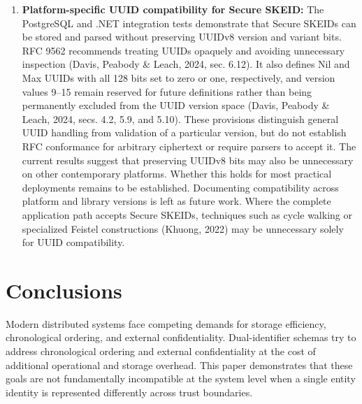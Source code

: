 \documentclass[fleqn,10pt,lineno]{wlpeerj}
\begin{document}
\begin{enumerate}
  release, containing algorithms, CDDL definitions, and test vectors.
  Formal IETF submission remains a separate dissemination step.
  Independent implementations in other languages would test the draft's
  interoperability through shared test vectors. Alternative bit
  allocations would require explicit trade-offs among timestamp
  precision, epoch duration, topology capacity, and sequence capacity,
  together with compatibility rules and validation.
\item
  \textbf{Platform-specific UUID compatibility for Secure SKEID:} The
  PostgreSQL and .NET integration tests demonstrate that Secure SKEIDs
  can be stored and parsed without preserving UUIDv8 version and variant
  bits. RFC 9562 recommends treating UUIDs opaquely and avoiding
  unnecessary inspection (Davis, Peabody \& Leach, 2024, sec. 6.12). It
  also defines Nil and Max UUIDs with all 128 bits set to zero or one,
  respectively, and version values 9--15 remain reserved for future
  definitions rather than being permanently excluded from the UUID
  version space (Davis, Peabody \& Leach, 2024, secs. 4.2, 5.9, and
  5.10). These provisions distinguish general UUID handling from
  validation of a particular version, but do not establish RFC
  conformance for arbitrary ciphertext or require parsers to accept it.
  The current results suggest that preserving UUIDv8 bits may also be
  unnecessary on other contemporary platforms. Whether this holds for
  most practical deployments remains to be established. Documenting
  compatibility across platform and library versions is left as future
  work. Where the complete application path accepts Secure SKEIDs,
  techniques such as cycle walking or specialized Feistel constructions
  (Khuong, 2022) may be unnecessary solely for UUID compatibility.
\end{enumerate}

\section{Conclusions}\label{conclusions}

Modern distributed systems face competing demands for storage
efficiency, chronological ordering, and external confidentiality.
Dual-identifier schemas try to address chronological ordering and
external confidentiality at the cost of additional operational and
storage overhead. This paper demonstrates that these goals are not
fundamentally incompatible at the system level when a single entity
identity is represented differently across trust boundaries.
\end{document}
